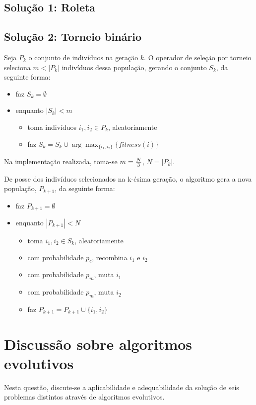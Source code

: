\documentclass[a4paper]{article}
\begin{document}
\subsection{Solução 1: Roleta}


\subsection{Solução 2: Torneio binário}

Seja $ P_{k} $ o conjunto de indivíduos na geração $ k $. O operador de seleção por torneio seleciona $ m < |P_k| $ indivíduos dessa população, gerando o conjunto $ S_{k} $, da seguinte forma:

\begin{itemize}
 \item faz $ S_{k} = \emptyset $
 \item enquanto $ |S_{k}| < m $
\begin{itemize}
 \item toma indivíduos $ i_1, i_2 \in P_{k} $, aleatoriamente
 \item faz $ S_{k} = S_{k} \cup \arg\max_{\{i_1,i_2\}}\{fitness(i)\} $
\end{itemize}
\end{itemize}

Na implementação realizada, toma-se $ m = {N \over 3} $, $ N = |P_k| $.

De posse dos indivíduos selecionados na k-ésima geração, o algoritmo gera a nova população, $ P_{k+1} $, da seguinte forma:

\begin{itemize}
 \item faz $ P_{k+1} = \emptyset $
 \item enquanto $ |P_{k+1}| < N $
\begin{itemize}
 \item toma $ i_1, i_2 \in S_{k} $, aleatoriamente
 \item com probabilidade $ p_c $, recombina $ i_1 $ e $ i_2 $
 \item com probabilidade $ p_m $, muta $ i_1 $
 \item com probabilidade $ p_m $, muta $ i_2 $
 \item faz $ P_{k+1} = P_{k+1} \cup \{i_1, i_2\} $
\end{itemize}

\end{itemize}



\section{Discussão sobre algoritmos evolutivos}
Nesta questão, discute-se a aplicabilidade e adequabilidade da solução de seis problemas distintos através de algoritmos evolutivos.
\end{document}
